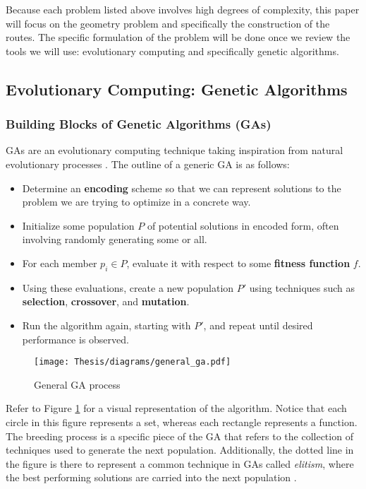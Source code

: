 \documentclass[11pt]{amsart}
\theoremstyle{definition}                  %
\theoremstyle{remark}                       %
\numberwithin{equation}{section}
\begin{document}
    Because each problem listed above involves high degrees of complexity, this paper will focus on the geometry problem and specifically the construction of the routes. The specific formulation of the problem will be done once we review the tools we will use: evolutionary computing and specifically genetic algorithms.  
    
\subsection{Evolutionary Computing: Genetic Algorithms}

\subsubsection{Building Blocks of Genetic Algorithms (GAs)}

    GAs are an evolutionary computing technique taking inspiration from natural evolutionary processes \cite{mitchell1998}. 
    The outline of a generic GA is as follows:
    \begin{itemize}
        \item Determine an \textbf{encoding} scheme so that we can represent solutions to the problem we are trying to optimize in a concrete way. 
        \item Initialize some population $P$ of potential solutions in encoded form, often involving randomly generating some or all. 
        \item For each member $p_i \in P$, evaluate it with respect to some \textbf{fitness function} $f$. 
        \item Using these evaluations, create a new population $P'$ using techniques such as \textbf{selection}, \textbf{crossover}, and \textbf{mutation}. 
        \item Run the algorithm again, starting with $P'$, and repeat until desired performance is observed. 
    \end{itemize}

    \begin{figure}
     \begin{center}
         \texttt{[image: Thesis/diagrams/general\_ga.pdf]}
     \end{center}
    \caption{General GA process}
     \label{diagram:GA}
     \end{figure}
    Refer to Figure \ref{diagram:GA} for a visual representation of the algorithm. Notice that each circle in this figure represents a set, whereas each rectangle represents a function. The breeding process is a specific piece of the GA that refers to the collection of techniques used to generate the next population. Additionally, the dotted line in the figure is there to represent a common technique in GAs called \textit{elitism}, where the best performing solutions are carried into the next population \cite{mitchell1998, nayeem2014}.
\end{document}
